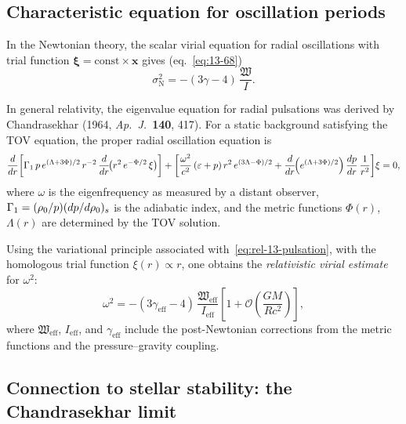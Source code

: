\subsection{Characteristic equation for oscillation periods}
\label{sec:rel-118-char}

In the Newtonian theory, the scalar virial equation for radial
oscillations with trial function $\boldsymbol{\xi} = \text{const}
\times \mathbf{x}$ gives (eq.~\eqref{eq:13-68})
\begin{equation}
\label{eq:rel-13-sigma-Newton}
\sigma^{2}_{\mathrm{N}} = -(3\gamma - 4)\,\frac{\mathfrak{W}}{I}.
\end{equation}

In general relativity, the eigenvalue equation for radial pulsations
was derived by Chandrasekhar (1964, \emph{Ap.\ J.}\ \textbf{140}, 417).
For a static background satisfying the TOV equation, the proper radial
oscillation equation is
\begin{equation}
\label{eq:rel-13-pulsation}
\frac{d}{dr}\!\left[
  \Gamma_{1}\,p\,e^{(\Lambda+3\Phi)/2}\,r^{-2}\,
  \frac{d}{dr}\!\bigl(r^{2}\,e^{-\Phi/2}\,\xi\bigr)
\right]
+ \left[
  \frac{\omega^{2}}{c^{2}}\,
  (\varepsilon + p)\,r^{2}\,e^{(3\Lambda-\Phi)/2}
  + \frac{d}{dr}\!\Bigl(e^{(\Lambda+3\Phi)/2}\Bigr)\,
    \frac{dp}{dr}\,\frac{1}{r^{2}}
\right]\!\xi = 0,
\end{equation}
where $\omega$ is the eigenfrequency as measured by a distant observer,
$\Gamma_{1} = (\rho_0/p)(dp/d\rho_0)_{s}$ is the adiabatic
index, and the metric functions $\Phi(r)$, $\Lambda(r)$ are determined
by the TOV solution.

Using the variational principle associated
with~\eqref{eq:rel-13-pulsation}, with the homologous trial function
$\xi(r) \propto r$, one obtains the \emph{relativistic virial
estimate} for $\omega^{2}$:
\begin{equation}
\label{eq:rel-13-sigma-GR}
\boxed{
\omega^{2} = -(3\gamma_{\mathrm{eff}} - 4)\,
  \frac{\mathfrak{W}_{\mathrm{eff}}}{I_{\mathrm{eff}}}
  \left[1 + \mathcal{O}\!\left(\frac{GM}{Rc^{2}}\right)\right],
}
\end{equation}
where $\mathfrak{W}_{\mathrm{eff}}$, $I_{\mathrm{eff}}$, and
$\gamma_{\mathrm{eff}}$ include the post-Newtonian corrections from
the metric functions and the pressure--gravity coupling.


\subsection{Connection to stellar stability: the Chandrasekhar limit}
\label{sec:rel-118-Chandra}

